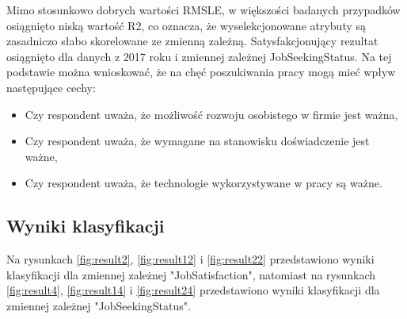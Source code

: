 Mimo stosunkowo dobrych wartości RMSLE, w większości badanych przypadków osiągnięto niską wartość R2, co oznacza, że wyselekcjonowane atrybuty są zasadniczo słabo skorelowane ze zmienną zależną.
Satysfakcjonujący rezultat osiągnięto dla danych z 2017 roku i zmiennej zależnej JobSeekingStatus.
Na tej podstawie można wnioskować, że na chęć poszukiwania pracy mogą mieć wpływ następujące cechy:

\begin{itemize}
    \item Czy respondent uważa, że możliwość rozwoju osobistego w firmie jest ważna,
    \item Czy respondent uważa, że wymagane na stanowisku doświadczenie jest ważne,
    \item Czy respondent uważa, że technologie wykorzystywane w pracy są ważne.
\end{itemize}

\subsection{Wyniki klasyfikacji}\label{sec:analysis:important-features:classification}

Na rysunkach \ref{fig:result2}, \ref{fig:result12} i \ref{fig:result22} przedstawiono wyniki klasyfikacji dla zmiennej zależnej "JobSatisfaction", natomiast na rysunkach \ref{fig:result4}, \ref{fig:result14} i \ref{fig:result24} przedstawiono wyniki klasyfikacji dla zmiennej zależnej "JobSeekingStatus".



